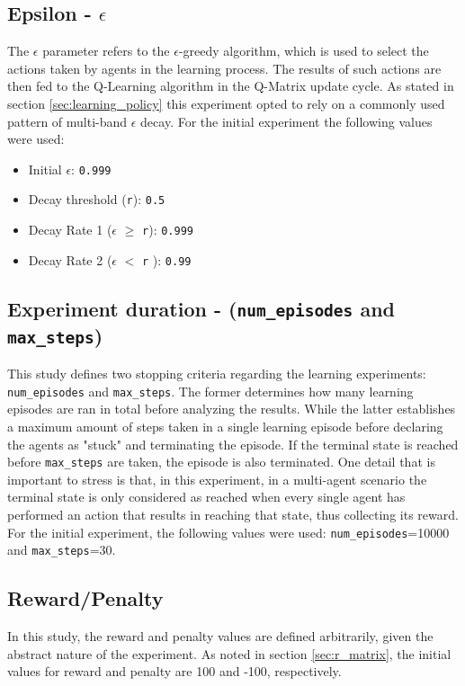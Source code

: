 \documentclass[11pt]{article}
\begin{document}
    \subsection{Epsilon - $\epsilon$}
        The $\epsilon$ parameter refers to the $\epsilon$-greedy algorithm, which is used to select the actions taken by agents in the learning process. The results of such actions are then fed to the Q-Learning algorithm in the Q-Matrix update cycle. As stated in section \ref{sec:learning_policy} this experiment opted to rely on a commonly used pattern of multi-band $\epsilon$ decay. For the initial experiment the following values were used:
        \begin{itemize}
            \item Initial $\epsilon$: \texttt{0.999}
            \item Decay threshold (\texttt{r}): \texttt{0.5}
            \item Decay Rate 1 ($\epsilon$ $\geqslant$ \texttt{r}): \texttt{0.999}
            \item Decay Rate 2 ($\epsilon$ $<$ \texttt{r} ): \texttt{0.99}
        \end{itemize}

    \subsection{Experiment duration - (\texttt{num\_episodes} and \texttt{max\_steps})}
        \sloppy This study defines two stopping criteria regarding the learning experiments: \texttt{num\_episodes} and \texttt{max\_steps}. The former determines how many learning episodes are ran in total before analyzing the results. While the latter establishes a maximum amount of steps taken in a single learning episode before declaring the agents as "stuck" and terminating the episode. If the terminal state is reached before \texttt{max\_steps} are taken, the episode is also terminated. One detail that is important to stress is that, in this experiment, in a multi-agent scenario the terminal state is only considered as reached when every single agent has performed an action that results in reaching that state, thus collecting its reward. For the initial experiment, the following values were used: \texttt{num\_episodes}=10000 and \texttt{max\_steps}=30.

    \subsection{Reward/Penalty}
        In this study, the reward and penalty values are defined arbitrarily, given the abstract nature of the experiment. As noted in section \ref{sec:r_matrix}, the initial values for reward and penalty are 100 and -100, respectively.
\end{document}
